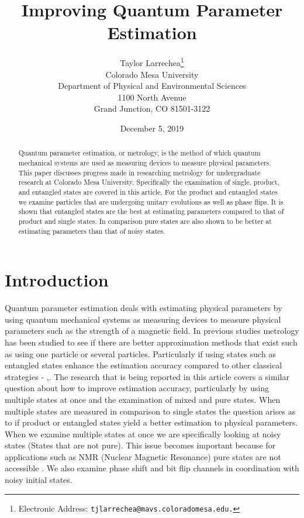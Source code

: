 \documentclass[twocolumn]{article}
\title{\textbf{Improving Quantum Parameter Estimation}}
\author{Taylor Larrechea\footnote{Electronic Address: \texttt{tjlarrechea@mavs.coloradomesa.edu.}} \\
    Colorado Mesa University \\
    Department of Physical and Environmental Sciences \\
    1100 North Avenue \\
    Grand Junction, CO 81501-3122}
\date{December 5, 2019}
\begin{document}
\maketitle
\begin{abstract}
Quantum parameter estimation, or metrology, is the method of which quantum mechanical systems are used as measuring devices to measure physical parameters. This paper discusses progress made in researching metrology for undergraduate research at Colorado Mesa University. Specifically the examination of single, product, and entangled states are covered in this article. For the product and entangled states we examine particles that are undergoing unitary evolutions as well as phase flips. It is shown that entangled states are the best at estimating parameters compared to that of product and single states. In comparison pure states are also shown to be better at estimating parameters than that of noisy states.
\end{abstract}
\section*{Introduction}
Quantum parameter estimation deals with estimating physical parameters by using quantum mechanical systems as measuring devices to measure physical parameters such as the strength of a magnetic field. In previous studies metrology has been studied to see if there are better approximation methods that exist such as using one particle or several particles. Particularly if using states such as entangled states enhance the estimation accuracy compared to other classical strategies \cite{Braunstein}-\cite{Caves} \cite{Helstrom},\cite{Sarovar}. The research that is being reported in this article covers a similar question about how to improve estimation accuracy, particularly by using multiple states at once and the examination of mixed and pure states. When multiple states are measured in comparison to single states the question arises as to if product or entangled states yield a better estimation to physical parameters. When we examine multiple states at once we are specifically looking at noisy states (States that are not pure). This issue becomes important because for applications such as NMR (Nuclear Magnetic Resonance) pure states are not accessible \cite{D. Collins}. We also examine phase shift and bit flip channels in coordination with noisy initial states.
\end{document}
